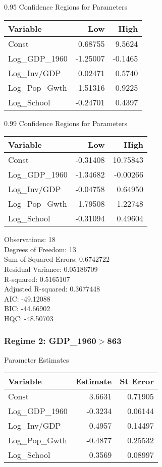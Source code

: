 0.95 Confidence Regions for Parameters \\
\begin{tabular}{l*{2}{r}}
\toprule
Variable   &    Low            &   High \\
\midrule 
Const   &    0.68755   &    9.5624 \\
Log\_GDP\_1960   &   -1.25007   &   -0.1465 \\
Log\_Inv/GDP   &    0.02471   &    0.5740 \\
Log\_Pop\_Gwth   &   -1.51316   &    0.9225 \\
Log\_School   &   -0.24701   &    0.4397 \\
\bottomrule
\end{tabular}
\bigskip 

0.99 Confidence Regions for Parameters \\
\begin{tabular}{l*{2}{r}}
\toprule
Variable   &    Low            &   High \\
\midrule 
Const   &   -0.31408   &   10.75843 \\
Log\_GDP\_1960   &   -1.34682   &   -0.00266 \\
Log\_Inv/GDP   &   -0.04758   &    0.64950 \\
Log\_Pop\_Gwth   &   -1.79508   &    1.22748 \\
Log\_School   &   -0.31094   &    0.49604 \\
\bottomrule
\end{tabular}
\bigskip 

Observations:                       18 \\
Degrees of Freedom:                 13 \\
Sum of Squared Errors:              0.6742722 \\
Residual Variance:                  0.05186709 \\
R-squared:                          0.5165107 \\
Adjusted R-squared:                 0.3677448 \\
AIC:                                -49.12088 \\
BIC:                                -44.66902 \\
HQC:                                -48.50703 \\

\subsubsection*{Regime 2: GDP\_1960$>$863 } 
Parameter Estimates \\
\begin{tabular}{l*{2}{r}}
\toprule
Variable    &   Estimate     &   St Error \\
\midrule 
Const   &    3.6631   &   0.71905 \\
Log\_GDP\_1960   &   -0.3234   &   0.06144 \\
Log\_Inv/GDP   &    0.4957   &   0.14497 \\
Log\_Pop\_Gwth   &   -0.4877   &   0.25532 \\
Log\_School   &    0.3569   &   0.08997 \\
\bottomrule
\end{tabular}
\bigskip 

